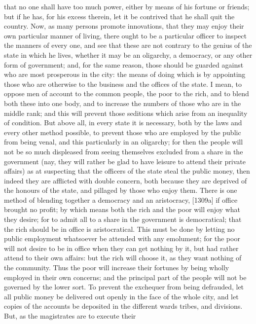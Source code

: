 that no one shall have too much power, either by means of his fortune or
friends; but if he has, for his excess therein, let it be contrived that
he shall quit the country. Now, as many persons promote innovations, that
they may enjoy their own particular manner of living, there ought to be a
particular officer to inspect the manners of every one, and see that these
are not contrary to the genius of the state in which he lives, whether it
may be an oligarchy, a democracy, or any other form of government; and,
for the same reason, those should be guarded against who are most
prosperous in the city: the means of doing which is by appointing those
who are otherwise to the business and the offices of the state. I mean, to
oppose men of account to the common people, the poor to the rich, and to
blend both these into one body, and to increase the numbers of those who
are in the middle rank; and this will prevent those seditions which arise
from an inequality of condition. But above all, in every state it is
necessary, both by the laws and every other method possible, to prevent
those who are employed by the public from being venal, and this
particularly in an oligarchy; for then the people will not be so much
displeased from seeing themselves excluded from a share in the government
(nay, they will rather be glad to have leisure to attend their private
affairs) as at suspecting that the officers of the state steal the public
money, then indeed they are afflicted with double concern, both because
they are deprived of the honours of the state, and pillaged by those who
enjoy them. There is one method of blending together a democracy and an
aristocracy, [1309a] if office brought no profit; by which means both the
rich and the poor will enjoy what they desire; for to admit all to a share
in the government is democratical; that the rich should be in office is
aristocratical. This must be done by letting no public employment
whatsoever be attended with any emolument; for the poor will not desire to
be in office when they can get nothing by it, but had rather attend to
their own affairs: but the rich will choose it, as they want nothing of
the community. Thus the poor will increase their fortunes by being wholly
employed in their own concerns; and the principal part of the people will
not be governed by the lower sort. To prevent the exchequer from being
defrauded, let all public money be delivered out openly in the face of the
whole city, and let copies of the accounts be deposited in the different
wards tribes, and divisions. But, as the magistrates are to execute their
